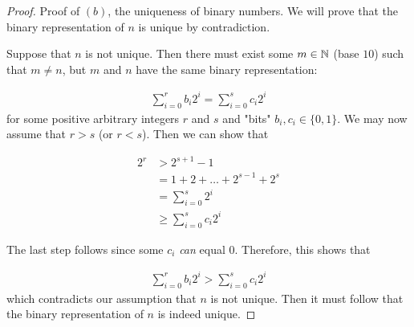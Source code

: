 \documentclass[12pt, a4paper]{amsart}
\theoremstyle{definition}
\theoremstyle{remark}
\numberwithin{Theorem}{section}
\begin{document}
\begin{proof}
    Proof of $(b)$, the uniqueness of binary numbers. We will prove
    that the binary representation of $n$ is unique by contradiction.
    
    Suppose that $n$ is not unique. Then there must exist some
    $m \in \mathbb N$ (base $10$) such that $m \neq n$, but 
    $m$ and $n$ have the same binary representation:
    
    \begin{align*}
        \sum_{i = 0}^{r}b_i 2^i = \sum_{i = 0}^{s}c_i 2^i
    \end{align*}
    for some positive arbitrary integers $r$ and $s$ and 
    "bits" $b_i, c_i \in \{ 0, 1 \}$. We may now assume
    that $r > s$ (or $r < s$). Then we can show that
    
    \begin{align*}
        2^r &> 2^{s + 1} - 1 \tag{by geometric series} \\
        &= 1 + 2 + \dots + 2^{s - 1} + 2^s \tag{geometric series expanded} \\
        &= \sum_{i = 0}^{s}2^i \\
        &\geqslant \sum_{i = 0}^{s}c_i 2^i
    \end{align*}
    
    The last step follows since some $c_i$ \emph{can} equal $0$.
    Therefore, this shows that
    
    \begin{align*}
        \sum_{i = 0}^{r}b_i 2^i > \sum_{i = 0}^{s}c_i 2^i
    \end{align*}
    which contradicts our assumption that $n$ is not unique.
    Then it must follow that the binary representation
    of $n$ is indeed unique.
\end{proof}


\newpage



    
\end{document}
